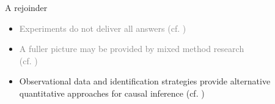 \documentclass[aspectratio=169]{beamer}
\begin{document}
	\begin{frame}{A rejoinder}
	 	\begin{itemize}[<+->]
			\item \textcolor<2->{gray}{Experiments do not deliver all answers (cf. \cite{Howe2004})}
			\item \textcolor<3->{gray}{A fuller picture may be provided by mixed method research \\ (cf. \cite{Imai2011,Latour2012,Blok2014})}
			\item Observational data and identification strategies provide alternative quantitative approaches for causal inference (cf. \cite{Gelman2014})
	 	\end{itemize}
	 	\vspace*{.5cm}
	\end{frame}
\end{document}

